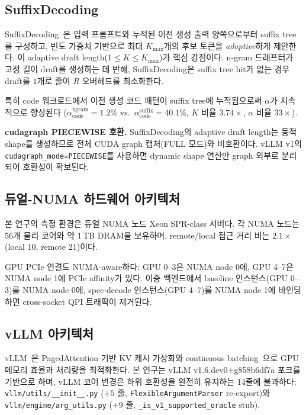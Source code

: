 \subsection{SuffixDecoding}
\label{subsec:suffix-decoding}

SuffixDecoding~\cite{snowflake-arctic}은 입력 프롬프트와
누적된 이전 생성 출력 양쪽으로부터 suffix tree를 구성하고,
빈도 가중치 기반으로 최대 $K_{\max}$개의 후보 토큰을 \emph{adaptive}하게 제안한다.
이 adaptive draft length($1 \leq K \leq K_{\max}$)가 핵심 강점이다.
n-gram 드래프터가 고정 길이 draft를 생성하는 데 반해,
SuffixDecoding은 suffix tree hit가 없는 경우 draft를 $1$개로 줄여
$R$ 오버헤드를 최소화한다.

특히 code 워크로드에서 이전 생성 코드 패턴이 suffix tree에 누적됨으로써
$\alpha$가 지속적으로 향상된다
($\alpha_{\text{code}}^{\text{ngram}} = 1.2\%$ vs.\ $\alpha_{\text{code}}^{\text{suffix}} = 40.1\%$,
$K$ 비율 $3.74\times$, $\alpha$ 비율 $33\times$).

\textbf{cudagraph PIECEWISE 호환.}
SuffixDecoding의 adaptive draft length는 동적 shape를 생성하므로
전체 CUDA graph 캡처(FULL 모드)와 비호환이다.
vLLM v1의 \texttt{cudagraph\_mode=PIECEWISE}를 사용하면
dynamic shape 연산만 graph 외부로 분리되어 호환성이 확보된다.

\subsection{듀얼-NUMA 하드웨어 아키텍처}
\label{subsec:numa-arch}

본 연구의 측정 환경은 듀얼 NUMA 노드 Xeon SPR-class 서버다.
각 NUMA 노드는 56개 물리 코어와 약 1\,TB DRAM을 보유하며,
remote/local 접근 거리 비는 $2.1\times$(local 10, remote 21)이다.

GPU PCIe 연결도 NUMA-aware하다:
GPU 0--3은 NUMA node 0에, GPU 4--7은 NUMA node 1에
PCIe affinity가 있다.
이중 백엔드에서 baseline 인스턴스(GPU 0--3)를 NUMA node 0에,
spec-decode 인스턴스(GPU 4--7)를 NUMA node 1에 바인딩하면
cross-socket QPI 트래픽이 제거된다.

\subsection{vLLM 아키텍처}
\label{subsec:vllm-arch}

vLLM~\cite{kwon2023vllm}은 PagedAttention 기반 KV 캐시 가상화와
continuous batching~\cite{yu2022orca}으로 GPU 메모리 효율과 처리량을 최적화한다.
본 연구는 vLLM v1.6.dev0+g858b6df7a 포크를 기반으로 하며,
vLLM 코어 변경은 하위 호환성을 완전히 유지하는 14줄에 불과하다:
\texttt{vllm/utils/\_\_init\_\_.py} ($+5$ 줄, \texttt{FlexibleArgumentParser} re-export)와
\texttt{vllm/engine/arg\_utils.py} ($+9$ 줄, \texttt{\_is\_v1\_supported\_oracle} stub).
